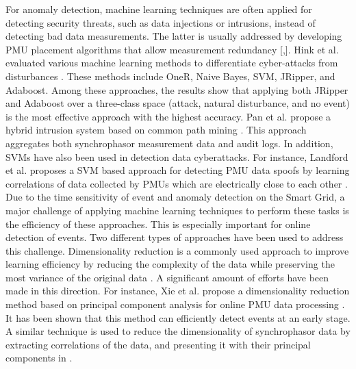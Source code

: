 For anomaly detection, machine learning techniques are often applied for detecting security threats, such as data injections or intrusions, instead of detecting bad data measurements. The latter is usually addressed by developing PMU placement algorithms that allow measurement redundancy [\cite{chen2006placement},\cite{tarali2012bad}]. Hink et al. evaluated various machine learning methods to differentiate cyber-attacks from disturbances \cite{hink2014machine}. These methods include OneR, Naive Bayes, SVM, JRipper, and Adaboost. Among these approaches, the results show that applying both JRipper and Adaboost over a three-class space (attack, natural disturbance, and no event) is the most effective approach with the highest accuracy. Pan et al. propose a hybrid intrusion system based on common path mining \cite{pan2015developing}. This approach aggregates both synchrophasor measurement data and audit logs. In addition, SVMs have also been used in detection data cyberattacks. For instance, Landford et al. proposes a SVM based approach for detecting PMU data spoofs by learning correlations of data collected by PMUs which are electrically close to each other \cite{landford2015fast}. Due to the time sensitivity of event and anomaly detection on the Smart Grid, a major challenge of applying machine learning techniques to perform these tasks is the efficiency of these approaches. This is especially important for online detection of events. Two different types of approaches have been used to address this challenge. Dimensionality reduction is a commonly used approach to improve learning efficiency by reducing the complexity of the data while preserving the most variance of the original data \cite{van2009dimensionality}. A significant amount of efforts have been made in this direction. For instance, Xie et al. propose a dimensionality reduction method based on principal component analysis for online PMU data processing \cite{xie2014dimensionality}. It has been shown that this method can efficiently detect events at an early stage. A similar technique is used to reduce the dimensionality of synchrophasor data by extracting correlations of the data, and presenting it with their principal components in \cite{dahal2012online}. 

\label{sec:related}